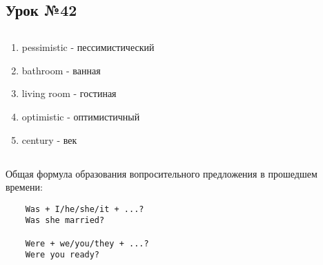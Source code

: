 \subsection{Урок №42}

\subsection*{}
\begin{multicols}{2}
    \begin{enumerate}\setlength{\itemsep}{0pt}
        \item pessimistic - пессимистический
        \item bathroom - ванная
        \item living room - гостиная
        \item optimistic - оптимистичный
        \item century - век
    \end{enumerate}
\end{multicols}

\subsection*{}
Общая формула образования вопросительного предложения в прошедшем времени:
\begin{verbatim}
    Was + I/he/she/it + ...?
    Was she married?

    Were + we/you/they + ...?
    Were you ready?
\end{verbatim}
